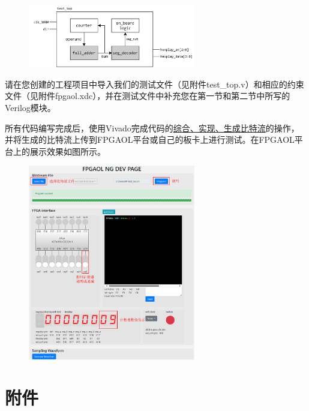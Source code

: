 \documentclass{ctexart}
\begin{document}
\begin{figure}[H]
    \centering
    \includegraphics[width=0.65\textwidth]{lab1/7.png}
\end{figure}

请在您创建的工程项目中导入我们的测试文件（见附件test\_top.v）和相应的约束文件（见附件fpgaol.xdc），并在测试文件中补充您在第一节和第二节中所写的Verilog模块。

所有代码编写完成后，使用Vivado完成代码的\underline{综合、实现、生成比特流}的操作，并将生成的比特流上传到FPGAOL平台或自己的板卡上进行测试。在FPGAOL平台上的展示效果如图所示。

\begin{figure}[H]
    \centering
    \includegraphics[width=0.65\textwidth]{lab1/8.png}
\end{figure}

\section{附件}
\end{document}
